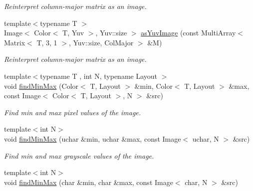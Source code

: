 \begin{DoxyCompactItemize}
\begin{DoxyCompactList}\small\item\em Reinterpret column-\/major matrix as an image. \end{DoxyCompactList}\item 
\hypertarget{group___image_gac9273f843fb0d04b3be0c254e920896b}{{\footnotesize template$<$typename T $>$ }\\Image$<$ Color$<$ T, Yuv $>$, Yuv\-::size $>$ \hyperlink{group___image_gac9273f843fb0d04b3be0c254e920896b}{as\-Yuv\-Image} (const Multi\-Array$<$ Matrix$<$ T, 3, 1 $>$, Yuv\-::size, Col\-Major $>$ \&M)}\label{group___image_gac9273f843fb0d04b3be0c254e920896b}

\begin{DoxyCompactList}\small\item\em Reinterpret column-\/major matrix as an image. \end{DoxyCompactList}\item 
\hypertarget{group___image_ga21de6940367133734d08916371bdf437}{{\footnotesize template$<$typename T , int N, typename Layout $>$ }\\void \hyperlink{group___image_ga21de6940367133734d08916371bdf437}{find\-Min\-Max} (Color$<$ T, Layout $>$ \&min, Color$<$ T, Layout $>$ \&max, const Image$<$ Color$<$ T, Layout $>$, N $>$ \&src)}\label{group___image_ga21de6940367133734d08916371bdf437}

\begin{DoxyCompactList}\small\item\em Find min and max pixel values of the image. \end{DoxyCompactList}\item 
\hypertarget{group___image_gaf693613759a2128fc40efb937bc98de7}{{\footnotesize template$<$int N$>$ }\\void \hyperlink{group___image_gaf693613759a2128fc40efb937bc98de7}{find\-Min\-Max} (uchar \&min, uchar \&max, const Image$<$ uchar, N $>$ \&src)}\label{group___image_gaf693613759a2128fc40efb937bc98de7}

\begin{DoxyCompactList}\small\item\em Find min and max grayscale values of the image. \end{DoxyCompactList}\item 
\hypertarget{group___image_gae77f9fc828bccd7a66f092b5f0a9b5d3}{{\footnotesize template$<$int N$>$ }\\void \hyperlink{group___image_gae77f9fc828bccd7a66f092b5f0a9b5d3}{find\-Min\-Max} (char \&min, char \&max, const Image$<$ char, N $>$ \&src)}\label{group___image_gae77f9fc828bccd7a66f092b5f0a9b5d3}


\end{DoxyCompactItemize}
